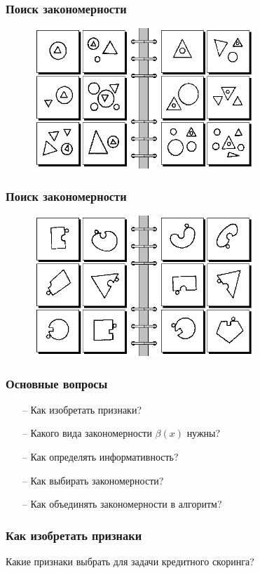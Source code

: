 \documentclass[12pt]{beamer}
\begin{document}
\begin{frame}\frametitle{Поиск закономерности}
\begin{figure}[htbp]
  \includegraphics[height=150pt, keepaspectratio = true]{images/bongard47}   
\end{figure}
\end{frame}

\begin{frame}\frametitle{Поиск закономерности}
\begin{figure}[htbp]
  \includegraphics[height=150pt, keepaspectratio = true]{images/bongard55}   
\end{figure}
\end{frame}

\begin{frame}\frametitle{Основные вопросы}
	\begin{itemize}
		\item[--] Как изобретать признаки? 
		\item[--] Какого вида закономерности $\beta(x)$ нужны?
		\item[--] Как определять информативность? 
		\item[--] Как выбирать закономерности?
		\item[--] Как объединять закономерности в алгоритм?
	\end{itemize}
\end{frame}

\begin{frame}\frametitle{Как изобретать признаки}
Какие признаки выбрать для задачи кредитного скоринга?
\end{frame}
\end{document}
